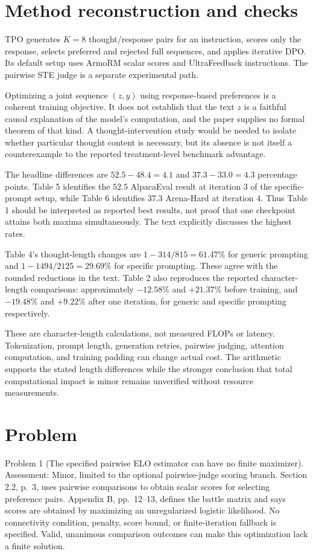 \documentclass[10pt]{article}
\begin{document}
\section*{Method reconstruction and checks}
TPO generates \(K=8\) thought/response pairs for an instruction, scores only the response, selects preferred and rejected full sequences, and applies iterative DPO. Its default setup uses ArmoRM scalar scores and UltraFeedback instructions. The pairwise STE judge is a separate experimental path.\par
Optimizing a joint sequence \((z,y)\) using response-based preferences is a coherent training objective. It does not establish that the text \(z\) is a faithful causal explanation of the model’s computation, and the paper supplies no formal theorem of that kind. A thought-intervention study would be needed to isolate whether particular thought content is necessary, but its absence is not itself a counterexample to the reported treatment-level benchmark advantage.\par
The headline differences are \(52.5-48.4=4.1\) and \(37.3-33.0=4.3\) percentage points. Table 5 identifies the \(52.5\) AlpacaEval result at iteration 3 of the specific-prompt setup, while Table 6 identifies \(37.3\) Arena-Hard at iteration 4. Thus Table 1 should be interpreted as reported best results, not proof that one checkpoint attains both maxima simultaneously. The text explicitly discusses the highest rates.\par
Table 4’s thought-length changes are \(1-314/815=61.47\%\) for generic prompting and \(1-1494/2125=29.69\%\) for specific prompting. These agree with the rounded reductions in the text. Table 2 also reproduces the reported character-length comparisons: approximately \(-12.58\%\) and \(+21.37\%\) before training, and \(-19.48\%\) and \(+9.22\%\) after one iteration, for generic and specific prompting respectively.\par
These are character-length calculations, not measured FLOPs or latency. Tokenization, prompt length, generation retries, pairwise judging, attention computation, and training padding can change actual cost. The arithmetic supports the stated length differences while the stronger conclusion that total computational impact is minor remains unverified without resource measurements.\par
\section*{Problem}
Problem 1 (The specified pairwise ELO estimator can have no finite maximizer).  Assessment: Minor, limited to the optional pairwise-judge scoring branch. Section 2.2, p. 3, uses pairwise comparisons to obtain scalar scores for selecting preference pairs. Appendix B, pp. 12–13, defines the battle matrix and says scores are obtained by maximizing an unregularized logistic likelihood. No connectivity condition, penalty, score bound, or finite-iteration fallback is specified. Valid, unanimous comparison outcomes can make this optimization lack a finite solution.\par
\end{document}

